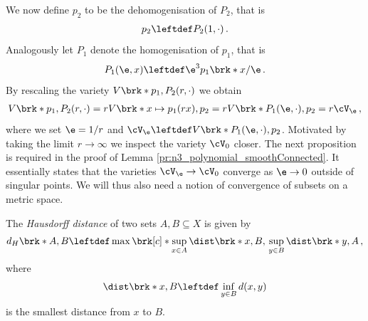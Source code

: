 We now define $p_2$ to be the dehomogenisation of $P_2$, that is
\begin{align}
  p_2\leftdef P_2(1,\cdot)\,.\label{eq:n3_polynomial_defp2}
\end{align}
Analogously let $P_1$ denote the homogenisation of $p_1$, that is
\begin{align}
  P_1(\e,x)\leftdef\e^3p_1\brk*{x/\e}\,.\label{eq:n3_polynomial_defP1}
\end{align}
By rescaling the variety $V\brk*{p_1,P_2(r,\cdot)}$ we obtain
\begin{align}
  V\brk*{p_1,P_2(r,\cdot)}=rV\brk*{x\mapsto p_1(rx),p_2}
  =rV\brk*{P_1(\e,\cdot),p_2}=r\cV_\e\label{eq:n3_polynomial_smoothConnected_relVeps}\,,
\end{align}
where we set $\e=1/r$ and $\cV_\e\leftdef V\brk*{P_1(\e,\cdot),p_2}$. Motivated by taking the limit $r\to\infty$ we
inspect the variety $\cV_0$ closer.
The next proposition is required in the proof of Lemma \ref{pr:n3_polynomial_smoothConnected}. It essentially states that the varieties
$\cV_\e\to\cV_0$ converge as $\e\to0$ outside of singular points.
We will thus also need a notion of convergence of subsets on a metric space.
\begin{definition}
  The \emph{Hausdorff distance} of two sets $A,B\subseteq X$ is given by 
  \begin{align}
    d_H\brk*{A,B}\leftdef\max\brk[c]*{\sup_{x\in A}\dist\brk*{x,B},\,\sup_{y\in B}\dist\brk*{y,A}}
    \label{eq:def_HausdorffMetric}\,,
  \end{align}
  where
  \begin{align}
    \dist\brk*{x,B}\leftdef\inf_{y\in B}d(x,y)\label{eq:def_distance}
  \end{align}
  is the smallest distance from $x$ to $B$.
\end{definition}

